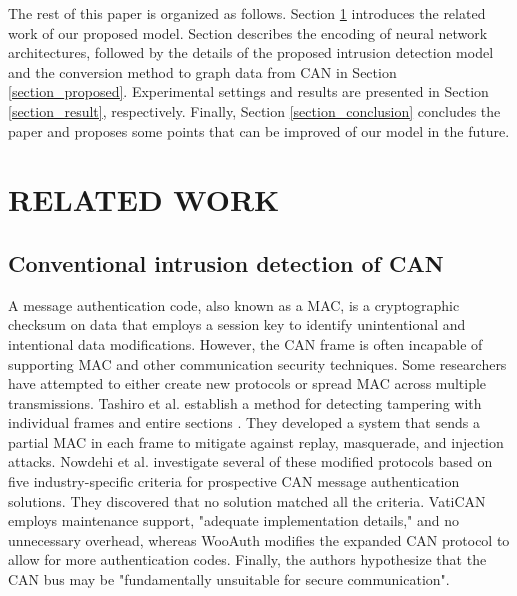 \documentclass[lettersize,journal]{IEEEtran}
\begin{document}
The rest of this paper is organized as follows. Section \ref{section_related_work} introduces the related work of our proposed model. Section \label{section_architecture_search_space} describes the encoding of neural network architectures, followed by the details of the proposed intrusion detection model and the conversion method to graph data from CAN in Section \ref{section_proposed}. Experimental settings and results are presented in Section \ref{section_result}, respectively. Finally, Section \ref{section_conclusion} concludes the paper and proposes some points that can be improved of our model in the future.
\section{RELATED WORK}\label{section_related_work}

\subsection{Conventional intrusion detection of CAN}
A message authentication code, also known as a MAC, is a cryptographic checksum on data that employs a session key to identify unintentional and intentional data modifications. However, the CAN frame is often incapable of supporting MAC \cite{44} and other communication security techniques. Some researchers \cite{45, 46} have attempted to either create new protocols or spread MAC across multiple transmissions. Tashiro et al. establish a method for detecting tampering with individual frames and entire sections \cite{45}. They developed a system that sends a partial MAC in each frame to mitigate against replay, masquerade, and injection attacks. Nowdehi et al. \cite{46} investigate several of these modified protocols based on five industry-specific criteria for prospective CAN message authentication solutions. They discovered that no solution matched all the criteria. VatiCAN employs maintenance support, "adequate implementation details," and no unnecessary overhead, whereas WooAuth modifies the expanded CAN protocol to allow for more authentication codes. Finally, the authors \cite{46} hypothesize that the CAN bus may be "fundamentally unsuitable for secure communication".
\end{document}

